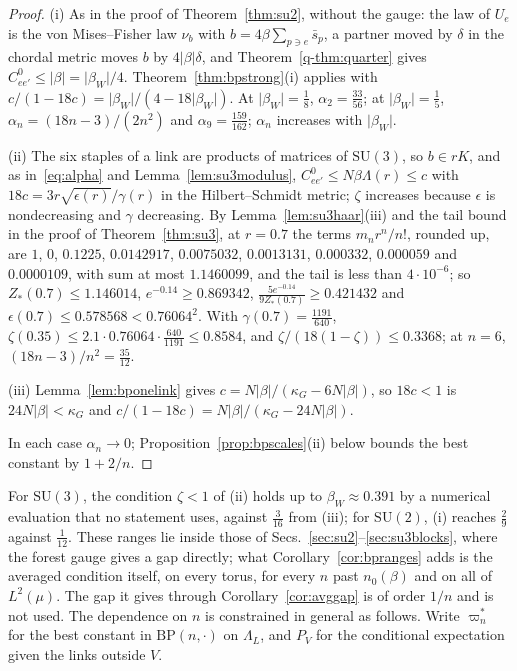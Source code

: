 \documentclass[aps,prd,twocolumn,superscriptaddress,nofootinbib,longbibliography,floatfix,amsmath,amssymb,10pt]{revtex4-2}
\theoremstyle{definition}
\theoremstyle{remark}
\newcommand{\SU}{\mathrm{SU}}
\begin{document}
\begin{proof}
(i) As in the proof of Theorem~\ref{thm:su2}, without the gauge: the law of
$U_e$ is the von Mises--Fisher law $\nu_b$ with $b=4\beta\sum_{p\ni e}\bar
s_p$, a partner moved by $\delta$ in the chordal metric moves $b$ by
$4\lvert\beta\rvert\delta$, and Theorem~\ref{q-thm:quarter} gives $C^0_{ee'}
\le\lvert\beta\rvert=\lvert\beta_W\rvert/4$. Theorem~\ref{thm:bpstrong}(i)
applies with $c/(1-18c)=\lvert\beta_W\rvert/(4-18\lvert\beta_W\rvert)$.
At $\lvert\beta_W\rvert=\frac18$, $\alpha_2=\frac{33}{56}$; at $\lvert
\beta_W\rvert=\frac15$, $\alpha_n=(18n-3)/(2n^2)$ and $\alpha_9=\frac{159}
{162}$; $\alpha_n$ increases with $\lvert\beta_W\rvert$.

(ii) The six staples of a link are products of matrices of $\SU(3)$, so
$b\in rK$, and as in~\eqref{eq:alpha} and Lemma~\ref{lem:su3modulus},
$C^0_{ee'}\le N\beta\Lambda(r)\le c$ with $18c=3r\sqrt{\epsilon(r)}/\gamma
(r)$ in the Hilbert--Schmidt metric; $\zeta$ increases because $\epsilon$
is nondecreasing and $\gamma$ decreasing. By Lemma~\ref{lem:su3haar}(iii)
and the tail bound in the proof of Theorem~\ref{thm:su3}, at $r=0.7$ the
terms $m_nr^n/n!$, rounded up, are $1$, $0$, $0.1225$, $0.0142917$,
$0.0075032$, $0.0013131$, $0.000332$, $0.000059$ and $0.0000109$, with sum
at most $1.1460099$, and the tail is less than $4\cdot10^{-6}$; so
$Z_*(0.7)\le1.146014$, $e^{-0.14}\ge0.869342$, $\frac{5e^{-0.14}}{9Z_*(0.7)}
\ge0.421432$ and $\epsilon(0.7)\le0.578568<0.76064^2$. With $\gamma(0.7)=
\frac{1191}{640}$, $\zeta(0.35)\le2.1\cdot0.76064\cdot\frac{640}{1191}\le
0.8584$, and $\zeta/(18(1-\zeta))\le0.3368$; at $n=6$, $(18n-3)/n^2=
\frac{35}{12}$.

(iii) Lemma~\ref{lem:bponelink} gives $c=N\lvert\beta\rvert/(\kappa_G-6N
\lvert\beta\rvert)$, so $18c<1$ is $24N\lvert\beta\rvert<\kappa_G$ and
$c/(1-18c)=N\lvert\beta\rvert/(\kappa_G-24N\lvert\beta\rvert)$.

In each case $\alpha_n\to0$; Proposition~\ref{prop:bpscales}(ii) below bounds
the best constant by $1+2/n$.
\end{proof}

For $\SU(3)$, the condition $\zeta<1$ of (ii) holds up to $\beta_W\approx
0.391$ by a numerical evaluation that no statement uses, against
$\frac3{16}$ from (iii); for $\SU(2)$, (i) reaches
$\frac29$ against $\frac1{12}$. These ranges lie inside those of
Secs.~\ref{sec:su2}--\ref{sec:su3blocks}, where the forest gauge gives a
gap directly; what Corollary~\ref{cor:bpranges} adds is the averaged
condition itself, on every torus, for every $n$ past $n_0(\beta)$ and on
all of $L^2(\mu)$. The gap it gives through Corollary~\ref{cor:avggap} is of
order $1/n$ and is not used. The dependence on $n$ is constrained in general
as follows. Write $\varpi^*_n$ for the best constant in $\mathrm{BP}(n,
\cdot)$ on $\Lambda_L$, and $P_V$ for the conditional expectation given the
links outside $V$.
\end{document}
